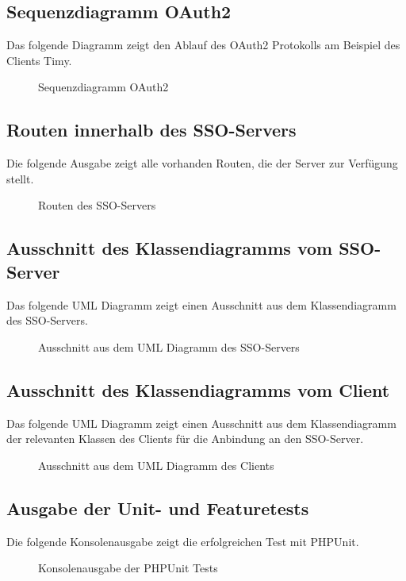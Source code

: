\subsection{Sequenzdiagramm OAuth2}
\label{app:sequenzdiagramm}
Das folgende Diagramm zeigt den Ablauf des OAuth2 Protokolls am Beispiel des Clients Timy.
\begin{figure}[htb]
\centering
{}
\caption{Sequenzdiagramm OAuth2}
\end{figure}
\clearpage



\subsection{Routen innerhalb des SSO-Servers}
\label{app:routes}
Die folgende Ausgabe zeigt alle vorhanden Routen, die der Server zur Verfügung stellt.
\begin{figure}[htb]
\centering
{}
\caption{Routen des SSO-Servers}
\end{figure}
\clearpage

\subsection{Ausschnitt des Klassendiagramms vom SSO-Server}
\label{app:passport-controllers}
Das folgende UML Diagramm zeigt einen Ausschnitt aus dem Klassendiagramm des \ac{SSO}-Servers.
\begin{figure}[htb]
\centering
{}
\caption{Ausschnitt aus dem UML Diagramm des SSO-Servers}
\end{figure}
\clearpage

\subsection{Ausschnitt des Klassendiagramms vom Client}
\label{app:passport-controllers}
Das folgende UML Diagramm zeigt einen Ausschnitt aus dem Klassendiagramm der relevanten Klassen des Clients für die Anbindung an den \ac{SSO}-Server.
\begin{figure}[htb]
\centering
{}
\caption{Ausschnitt aus dem UML Diagramm des Clients}
\end{figure}
\clearpage

\subsection{Ausgabe der Unit- und Featuretests}
\label{app:tests}
Die folgende Konsolenausgabe zeigt die erfolgreichen Test mit PHPUnit.
\begin{figure}[htb]
\centering
{}
\caption{Konsolenausgabe der PHPUnit Tests}
\end{figure}
\clearpage

